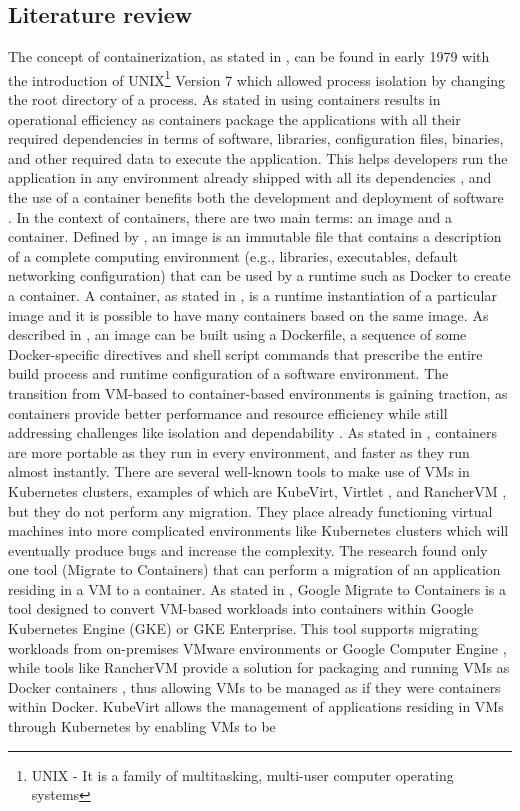 \documentclass{article}
\begin{document}
\begin{multicols}{2}
\section{Literature review}
The concept of containerization, as stated in \cite{Bhat-2022}, can be found in early 1979 with the introduction of UNIX\footnote{UNIX - It is a family of multitasking, multi-user computer operating systems} Version 7 which allowed process isolation by changing the root directory of a process. As stated in \cite{SiddiquiEtAl-2020} using containers results in operational efficiency as containers package the applications with all their required dependencies in terms of software, libraries, configuration files, binaries, and other required data to execute the application. This helps developers run the application in any environment already shipped with all its dependencies \cite{SiddiquiEtAl-2020}, and the use of a container benefits both the development and deployment of software \cite{VermaEtAl-2022}. In the context of containers, there are two main terms: an image and a container. Defined by \cite{HaleEtAl-2017}, an image is an immutable file that contains a description of a complete computing environment (e.g., libraries, executables, default networking configuration) that can be used by a runtime such as Docker to create a container. A container, as stated in \cite{HaleEtAl-2017}, is a runtime instantiation of a particular image and it is possible to have many containers based on the same image. As described in \cite{HaleEtAl-2017}, an image can be built using a Dockerfile, a sequence of some Docker-specific directives and shell script commands that prescribe the entire build process and runtime configuration of a software environment. The transition from VM-based to container-based environments is gaining traction, as containers provide better performance and resource efficiency while still addressing challenges like isolation and dependability \cite{GargEtAl-2024}. As stated in \cite{Yade-2022}, containers are more portable as they run in every environment, and faster as they run almost instantly. There are several well-known tools to make use of VMs in Kubernetes clusters, examples of which are KubeVirt, Virtlet \cite{Sheldon-2022}, and RancherVM \cite{Baccini-2021}, but they do not perform any migration. They place already functioning virtual machines into more complicated environments like Kubernetes clusters which will eventually produce bugs and increase the complexity. The research found only one tool (Migrate to Containers\cite{Google-2024}) that can perform a migration of an application residing in a VM to a container. As stated in \cite{Google-2024}, Google Migrate to Containers is a tool designed to convert VM-based workloads into containers within Google Kubernetes Engine (GKE) or GKE Enterprise. This tool supports migrating workloads from on-premises VMware environments or Google Computer Engine \cite{Google-2024}, while tools like RancherVM provide a solution for packaging and running VMs as Docker containers \cite{Baccini-2021}, thus allowing VMs to be managed as if they were containers within Docker. KubeVirt allows the management of applications residing in VMs through Kubernetes by enabling VMs to be 
\end{multicols}
\end{document}
